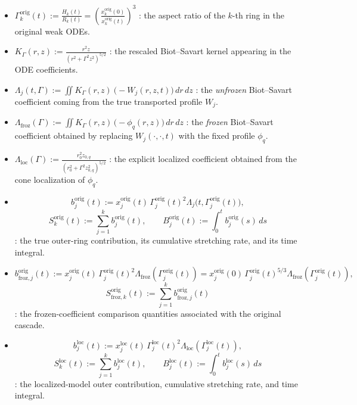 \documentclass[reqno,11pt]{amsart}
\begin{document}
\begin{itemize}
\begin{itemize}
    \item
    $
        \Gamma_k^{\mathrm{orig}}(t)
        :=\frac{H_k(t)}{R_k(t)}
        =\left(\frac{x_k^{\mathrm{orig}}(0)}{x_k^{\mathrm{orig}}(t)}\right)^3
    $
    : the aspect ratio of the $k$-th ring in the original weak ODEs.

    \item
    $
        K_\Gamma(r,z):=\frac{r^2 z}{(r^2+\Gamma^2 z^2)^{5/2}}
    $
    : the rescaled Biot--Savart kernel appearing in the ODE coefficients.

    \item
    $
        \Lambda_j(t,\Gamma):=\iint K_\Gamma(r,z)\
        \big(-W_j(r,z,t)\big)\,dr\,dz
    $
    : the \emph{unfrozen} Biot--Savart coefficient coming from the true transported profile $W_j$.

    \item
    $
        \Lambda_{\mathrm{froz}}(\Gamma):=\iint K_\Gamma(r,z)\,\big(-\phi_q(r,z)\big)\,dr\,dz
    $
    : the \emph{frozen} Biot--Savart coefficient obtained by replacing $W_j(\cdot,\cdot,t)$ with the fixed profile $\phi_q$.

    \item
    $
        \Lambda_{\mathrm{loc}}(\Gamma)
        :=\frac{r_0^2 z_{0,q}}{(r_0^2+\Gamma^2 z_{0,q}^2)^{5/2}}
    $
    : the explicit localized coefficient obtained from the cone localization of $\phi_q$.

    \item
    \[
        b_j^{\mathrm{orig}}(t)
        :=x_j^{\mathrm{orig}}(t)\,\Gamma_j^{\mathrm{orig}}(t)^2
        \Lambda_j\!\bigl(t,\Gamma_j^{\mathrm{orig}}(t)\bigr),
    \]
    \[
        S_k^{\mathrm{orig}}(t):=\sum_{j=1}^k b_j^{\mathrm{orig}}(t),
        \qquad
        B_j^{\mathrm{orig}}(t):=\int_0^t b_j^{\mathrm{orig}}(s)\,ds
    \]
    : the true outer-ring contribution, its cumulative stretching rate, and its time integral.

    \item
    \[
        b_{\mathrm{froz},j}^{\mathrm{orig}}(t)
        :=x_j^{\mathrm{orig}}(t)\,\Gamma_j^{\mathrm{orig}}(t)^2
        \Lambda_{\mathrm{froz}}(\Gamma_j^{\mathrm{orig}}(t))
        =x_j^{\mathrm{orig}}(0)\,\Gamma_j^{\mathrm{orig}}(t)^{5/3}
        \Lambda_{\mathrm{froz}}(\Gamma_j^{\mathrm{orig}}(t)),
    \]
    \[
        S_{\mathrm{froz},k}^{\mathrm{orig}}(t):=\sum_{j=1}^k b_{\mathrm{froz},j}^{\mathrm{orig}}(t)
    \]
    : the frozen-coefficient comparison quantities associated with the original cascade.

    \item
    \[
        b_j^{\mathrm{loc}}(t)
        :=x_j^{\mathrm{loc}}(t)\,\Gamma_j^{\mathrm{loc}}(t)^2
        \Lambda_{\mathrm{loc}}(\Gamma_j^{\mathrm{loc}}(t)),
    \]
    \[
        S_k^{\mathrm{loc}}(t):=\sum_{j=1}^k b_j^{\mathrm{loc}}(t),
        \qquad
        B_j^{\mathrm{loc}}(t):=\int_0^t b_j^{\mathrm{loc}}(s)\,ds
    \]
    : the localized-model outer contribution, cumulative stretching rate, and time integral.


\end{itemize}
\end{itemize}
\end{document}
